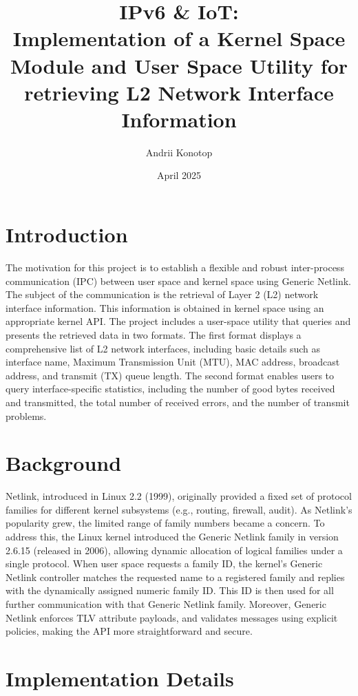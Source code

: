 \documentclass[10pt, letterpaper]{article}
\title{IPv6 \& IoT: \\ Implementation of a Kernel Space Module and User
Space Utility for retrieving L2 Network Interface Information}
\author{Andrii Konotop}
\date{April 2025}
\begin{document}
\maketitle

\tableofcontents
\newpage

\section{Introduction}
The motivation for this project is to establish a flexible and robust inter-process
communication (IPC) between user space and kernel space using Generic Netlink. The
subject of the communication is the retrieval of Layer 2 (L2) network interface
information. This information is obtained in kernel space using an appropriate kernel API.
The project includes a user-space utility that queries and presents the retrieved data in
two formats. The first format displays a comprehensive list of L2 network interfaces,
including basic details such as interface name, Maximum Transmission Unit (MTU), MAC
address, broadcast address, and transmit (TX) queue length. The second format enables
users to query interface-specific statistics, including the number of good bytes received
and transmitted, the total number of received errors, and the number of transmit problems.

\section{Background}
Netlink, introduced in Linux 2.2 (1999), originally provided a fixed set of protocol
families for different kernel subsystems (e.g., routing, firewall, audit). As Netlink's
popularity grew, the limited range of family numbers became a concern. To address this,
the Linux kernel introduced the Generic Netlink family in version 2.6.15 (released in
2006), allowing dynamic allocation of logical families under a single protocol. When user
space requests a family ID, the kernel’s Generic Netlink controller matches the requested
name to a registered family and replies with the dynamically assigned numeric family ID.
This ID is then used for all further communication with that Generic Netlink family.
Moreover, Generic Netlink enforces TLV attribute payloads, and validates messages using
explicit policies, making the API more straightforward and secure.

\section{Implementation Details}
\end{document}
